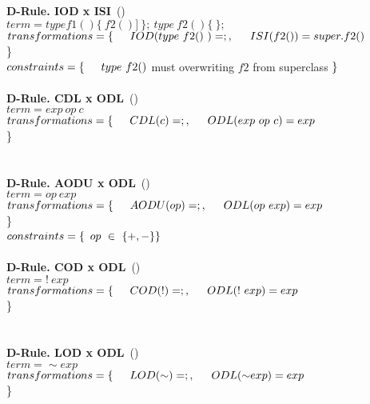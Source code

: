 \textbf{D-Rule. IOD x ISI}~(\mujava{})\\
$term = type f1()\{~f2()]~\};~type~f2()\{~\}; $\\
$transformations = \{\\ \indent IOD(type~f2(){~}) = ;,\\ \indent ISI(f2()) = super.f2()$\\\}\\
$constraints = \{ \\ \indent type~f2(){ }$ must overwriting $f2$ from superclass $\\ \}$
\\
\\
\textbf{D-Rule. CDL x ODL}~(\mujava{})\\
$term = exp~op~c $\\
$transformations = \{\\ \indent CDL(c) = ;,\\ \indent ODL(exp~op~c) = exp$\\\}\\
\\
\\
\textbf{D-Rule. AODU x ODL}~(\mujava{})\\
$term = op~exp $\\
$transformations = \{\\ \indent AODU(op) = ;,\\ \indent ODL(op~exp) = exp$\\\}\\
$constraints = \{ \\$ \indent $op~\in~\{+, -\}  \\ \}$
\\
\\
\textbf{D-Rule. COD x ODL}~(\mujava{})\\
$term = !~exp $\\
$transformations = \{\\ \indent COD(!) = ;,\\ \indent ODL(!~exp) = exp$\\\}\\
\\
\\
\textbf{D-Rule. LOD x ODL}~(\mujava{})\\
$term = {\sim}exp $\\
$transformations = \{\\ \indent LOD({\sim}) = ;,\\ \indent ODL({\sim}exp) = exp$\\\}\\
